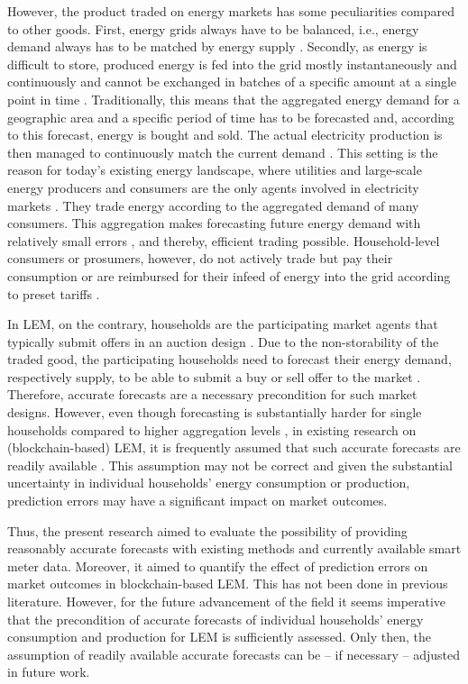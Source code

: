 However, the product traded on energy markets has some peculiarities compared to other goods. First, energy grids always have to be balanced, i.e., energy demand always has to be matched by energy supply \citep{Weron:2006}. Secondly, as energy is difficult to store, produced energy is fed into the grid mostly instantaneously and continuously and cannot be exchanged in batches of a specific amount at a single point in time \citep{Rosen:2013}. Traditionally, this means that the aggregated energy demand for a geographic area and a specific period of time has to be forecasted and, according to this forecast, energy is bought and sold. The actual electricity production is then managed to continuously match the current demand \citep{Rosen:2013}. This setting is the reason for today's existing energy landscape, where utilities and large-scale energy producers and consumers are the only agents involved in electricity markets \citep{Weron:2006, Buchmann:2013}. They trade energy according to the aggregated demand of many consumers. This aggregation makes forecasting future energy demand with relatively small errors \citep{Meer:2018, Wang:2018}, and thereby, efficient trading possible. Household-level consumers or prosumers, however, do not actively trade but pay their consumption or are reimbursed for their infeed of energy into the grid according to preset tariffs \citep{Rosen:2013}. 

In LEM, on the contrary, households are the participating market agents that typically submit offers in an auction design \citep{Ilic:2012, Lamparter:2010}. Due to the non-storability of the traded good, the participating households need to forecast their energy demand, respectively supply, to be able to submit a buy or sell offer to the market \citep{Rosen:2013}. Therefore, accurate forecasts are a necessary precondition for such market designs. However, even though forecasting is substantially harder for single households compared to higher aggregation levels \citep{Wang:2018}, in existing research on (blockchain-based) LEM, it is frequently assumed that such accurate forecasts are readily available \citep{Rosen:2013, Mengelkamp:2018c, Lamparter:2010, Buchmann:2013, Mengelkamp:2018a}. This assumption may not be correct and given the substantial uncertainty in individual households' energy consumption or production, prediction errors may have a significant impact on market outcomes.

Thus, the present research aimed to evaluate the possibility of providing reasonably accurate forecasts with existing methods and currently available smart meter data. Moreover, it aimed to quantify the effect of prediction errors on market outcomes in blockchain-based LEM. This has not been done in previous literature. However, for the future advancement of the field it seems imperative that the precondition of accurate forecasts of individual households' energy consumption and production for LEM is sufficiently assessed. Only then, the assumption of readily available accurate forecasts can be -- if necessary -- adjusted in future work.

